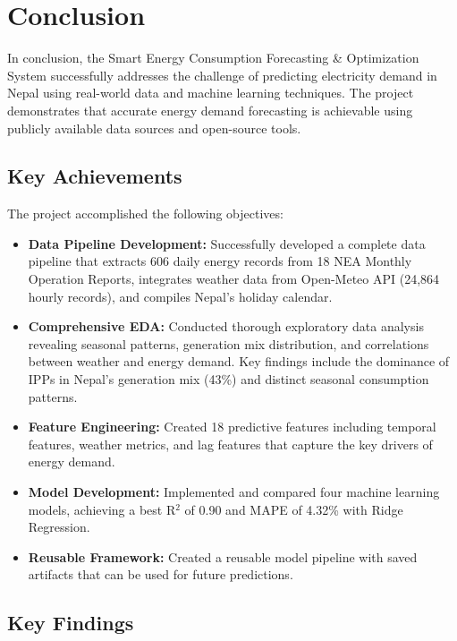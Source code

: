\chapter{Conclusion}
In conclusion, the Smart Energy Consumption Forecasting \& Optimization System successfully addresses the challenge of predicting electricity demand in Nepal using real-world data and machine learning techniques. The project demonstrates that accurate energy demand forecasting is achievable using publicly available data sources and open-source tools.

\section{Key Achievements}
The project accomplished the following objectives:

\begin{itemize}
    \item \textbf{Data Pipeline Development:} Successfully developed a complete data pipeline that extracts 606 daily energy records from 18 NEA Monthly Operation Reports, integrates weather data from Open-Meteo API (24,864 hourly records), and compiles Nepal's holiday calendar.

    \item \textbf{Comprehensive EDA:} Conducted thorough exploratory data analysis revealing seasonal patterns, generation mix distribution, and correlations between weather and energy demand. Key findings include the dominance of IPPs in Nepal's generation mix (43\%) and distinct seasonal consumption patterns.

    \item \textbf{Feature Engineering:} Created 18 predictive features including temporal features, weather metrics, and lag features that capture the key drivers of energy demand.

    \item \textbf{Model Development:} Implemented and compared four machine learning models, achieving a best R$^2$ of 0.90 and MAPE of 4.32\% with Ridge Regression.

    \item \textbf{Reusable Framework:} Created a reusable model pipeline with saved artifacts that can be used for future predictions.
\end{itemize}

\section{Key Findings}

